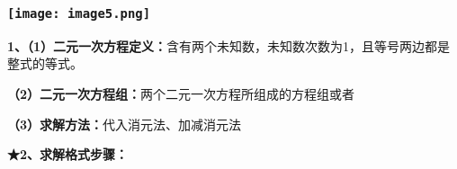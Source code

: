 \hypertarget{ux5b66ux79d1ux7f51www.zxxk.com--ux6559ux80b2ux8d44ux6e90ux95e8ux6237ux63d0ux4f9bux8bd5ux9898ux8bd5ux5377ux6559ux6848ux8bfeux4ef6ux6559ux5b66ux8bbaux6587ux7d20ux6750ux7b49ux5404ux7c7bux6559ux5b66ux8d44ux6e90ux5e93ux4e0bux8f7dux8fd8ux6709ux5927ux91cfux4e30ux5bccux7684ux6559ux5b66ux8d44ux8baf-32}{%
\subsubsection{\texorpdfstring{\protect\texttt{[image: image5.png]}}{学科网(www.zxxk.com)-\/-教育资源门户，提供试题试卷、教案、课件、教学论文、素材等各类教学资源库下载，还有大量丰富的教学资讯！}}\label{ux5b66ux79d1ux7f51www.zxxk.com--ux6559ux80b2ux8d44ux6e90ux95e8ux6237ux63d0ux4f9bux8bd5ux9898ux8bd5ux5377ux6559ux6848ux8bfeux4ef6ux6559ux5b66ux8bbaux6587ux7d20ux6750ux7b49ux5404ux7c7bux6559ux5b66ux8d44ux6e90ux5e93ux4e0bux8f7dux8fd8ux6709ux5927ux91cfux4e30ux5bccux7684ux6559ux5b66ux8d44ux8baf-32}}

\textbf{1、（1）二元一次方程定义：}含有两个未知数，未知数次数为1，且等号两边都是整式的等式。

\textbf{（2）二元一次方程组：}两个二元一次方程所组成的方程组或者

\textbf{（3）求解方法：}代入消元法、加减消元法

\textbf{★2、求解格式步骤：}

